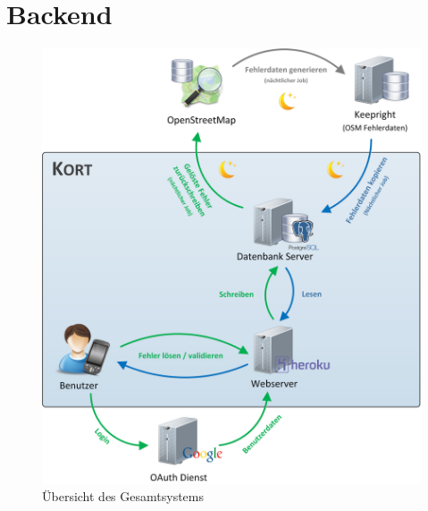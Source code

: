 \chapter{Backend}
\label{backend}

\begin{figure}[H]
	\centering
	\includegraphics[width=\textwidth]{images/implementation/backend/kort-big_picture}
	\caption{Übersicht des Gesamtsystems}
	\label{image-kort-big-picture}
\end{figure}









